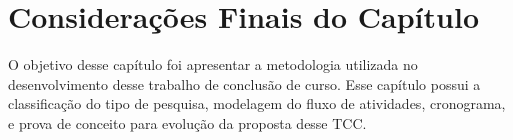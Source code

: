

\section{Considerações Finais do Capítulo}

O objetivo desse capítulo foi apresentar a metodologia utilizada no desenvolvimento
desse trabalho de conclusão de curso. Esse capítulo possui a classificação do tipo
de pesquisa, modelagem do fluxo de atividades, cronograma, e prova de conceito para
evolução da proposta desse TCC.
